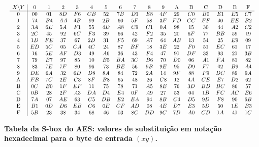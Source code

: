 \documentclass[12pt,a4paper]{article}
\begin{document}
\begingroup
\setlength{\tabcolsep}{2pt}
\renewcommand{\arraystretch}{0.95}
\scriptsize
\[
\resizebox{\textwidth}{!}{$
\begin{array}{c|cccccccccccccccc}
X \backslash Y & 0 & 1 & 2 & 3 & 4 & 5 & 6 & 7 & 8 & 9 & \mathrm{A} & \mathrm{B} & \mathrm{C} & \mathrm{D} & \mathrm{E} & \mathrm{F} \\
\hline
0 & 00 & 01 & 8D & F6 & CB & 52 & 7B & D1 & E8 & 4F & 29 & C0 & B0 & E1 & E5 & C7 \\
1 & 74 & B4 & AA & 4B & 99 & 2B & 60 & 5F & 58 & 3F & FD & CC & FF & 40 & EE & B2 \\
2 & 3A & 6E & 5A & F1 & 55 & 4D & A8 & C9 & C1 & 0A & 98 & 15 & 30 & 44 & A2 & C2 \\
3 & 2C & 45 & 92 & 6C & F3 & 39 & 66 & 42 & F2 & 35 & 20 & 6F & 77 & BB & 59 & 19 \\
4 & 1D & FE & 37 & 67 & 2D & 31 & F5 & 69 & A7 & 64 & AB & 13 & 54 & 25 & E9 & 09 \\
5 & ED & 5C & 05 & CA & 4C & 24 & 87 & BF & 18 & 3E & 22 & F0 & 51 & EC & 61 & 17 \\
6 & 16 & 5E & AF & D3 & 49 & A6 & 36 & 43 & F4 & 47 & 91 & DF & 33 & 93 & 21 & 3B \\
7 & 79 & B7 & 97 & 85 & 10 & B5 & BA & 3C & B6 & 70 & D0 & 06 & A1 & FA & 81 & 82 \\
8 & 83 & 7E & 7F & 80 & 96 & 73 & BE & 56 & 9B & 9E & 95 & D9 & F7 & 02 & B9 & A4 \\
9 & DE & 6A & 32 & 6D & D8 & 8A & 84 & 72 & 2A & 14 & 9F & 88 & F9 & DC & 89 & 9A \\
\mathrm{A} & FB & 7C & 2E & C3 & 8F & B8 & 65 & 48 & 26 & C8 & 12 & 4A & CE & E7 & D2 & 62 \\
\mathrm{B} & 0C & E0 & 1F & EF & 11 & 75 & 78 & 71 & A5 & 8E & 76 & 3D & BD & BC & 86 & 57 \\
\mathrm{C} & 0B & 28 & 2F & A3 & DA & D4 & E4 & 0F & A9 & 27 & 53 & 04 & 1B & FC & AC & E6 \\
\mathrm{D} & 7A & 07 & AE & 63 & C5 & DB & E2 & EA & 94 & 8B & C4 & D5 & 9D & F8 & 90 & 6B \\
\mathrm{E} & B1 & 0D & D6 & EB & C6 & 0E & CF & AD & 08 & 4E & D7 & E3 & 5D & 50 & 1E & B3 \\
\mathrm{F} & 5B & 23 & 38 & 34 & 68 & 46 & 03 & 8C & DD & 9C & 7D & A0 & CD & 1A & 41 & 1C
\end{array}
$}
\]
\endgroup

\textbf{Tabela da S-box do AES: valores de substitui\c{c}\~{a}o em nota\c{c}\~{a}o hexadecimal para o byte de entrada $(xy)$.}
\end{document}
